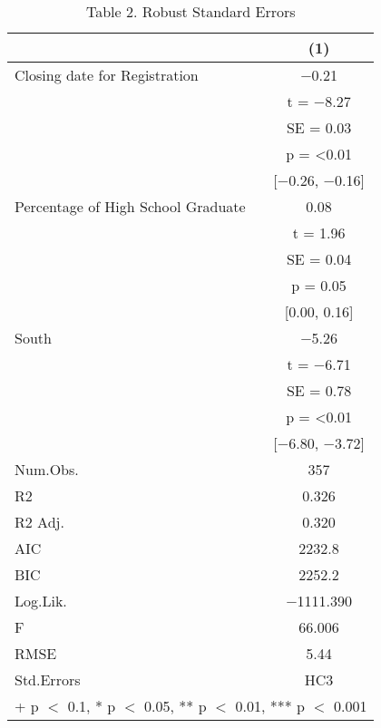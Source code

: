 \documentclass[
  letterpaper,
  DIV=11,
  numbers=noendperiod]{scrartcl}
\begin{document}
\begin{table}

\caption{Table 2. Robust Standard Errors}
\centering
\begin{tabular}[t]{lc}
\toprule
  & (1)\\
\midrule
Closing date for Registration & \num{-0.21}\\
 & t = \num{-8.27}\\
 & SE = \num{0.03}\\
 & p = \vphantom{1} \num{<0.01}\\
 & {}[\num{-0.26}, \num{-0.16}]\\
Percentage of High School Graduate & \num{0.08}\\
 & t = \num{1.96}\\
 & SE = \num{0.04}\\
 & p = \num{0.05}\\
 & {}[\num{0.00}, \num{0.16}]\\
South & \num{-5.26}\\
 & t = \num{-6.71}\\
 & SE = \num{0.78}\\
 & p = \num{<0.01}\\
 & {}[\num{-6.80}, \num{-3.72}]\\
\midrule
Num.Obs. & \num{357}\\
R2 & \num{0.326}\\
R2 Adj. & \num{0.320}\\
AIC & \num{2232.8}\\
BIC & \num{2252.2}\\
Log.Lik. & \num{-1111.390}\\
F & \num{66.006}\\
RMSE & \num{5.44}\\
Std.Errors & HC3\\
\bottomrule
\multicolumn{2}{l}{\rule{0pt}{1em}+ p $<$ 0.1, * p $<$ 0.05, ** p $<$ 0.01, *** p $<$ 0.001}\\
\end{tabular}
\end{table}
\end{document}
